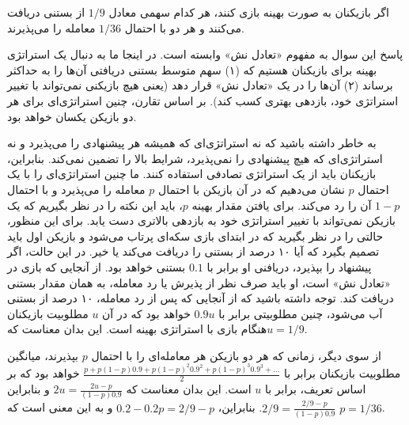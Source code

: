 \begin{solution}
اگر بازیکنان به صورت بهینه بازی کنند، هر کدام سهمی معادل $1/9$ از بستنی دریافت می‌کنند و هر دو با احتمال $1/36$ معامله را می‌پذیرند.

پاسخ این سوال به مفهوم «تعادل نش» وابسته است. در اینجا ما به دنبال یک استراتژی بهینه برای بازیکنان هستیم که (۱) سهم متوسط بستنی دریافتی آن‌ها را به حداکثر برساند (۲) آن‌ها را در یک «تعادل نش» قرار دهد (یعنی هیچ بازیکنی نمی‌تواند با تغییر استراتژی خود، بازدهی بهتری کسب کند). بر اساس تقارن، چنین استراتژی‌ای برای هر دو بازیکن یکسان خواهد بود.

به خاطر داشته باشید که نه استراتژی‌ای که همیشه هر پیشنهادی را می‌پذیرد و نه استراتژی‌ای که هیچ پیشنهادی را نمی‌پذیرد، شرایط بالا را تضمین نمی‌کند. بنابراین، بازیکنان باید از یک استراتژی تصادفی استفاده کنند. ما چنین استراتژی‌ای را با یک احتمال $p$ نشان می‌دهیم که در آن بازیکن با احتمال $p$ معامله را می‌پذیرد و با احتمال $1-p$ آن را رد می‌کند. برای یافتن مقدار بهینه $p$، باید این نکته را در نظر بگیریم که یک بازیکن نمی‌تواند با تغییر استراتژی خود به بازدهی بالاتری دست یابد. برای این منظور،  حالتی را در نظر بگیرید که در ابتدای بازی سکه‌ای پرتاب می‌شود و بازیکن اول باید تصمیم بگیرد که آیا ۱۰ درصد از بستنی را دریافت می‌کند یا خیر. در این حالت، اگر پیشنهاد را بپذیرد، دریافنی او برابر با $0.1$ بستنی خواهد بود. از آنجایی که بازی در «تعادل نش» است، او باید صرف نظر از پذیرش یا رد معامله، به همان مقدار بستنی دریافت کند. توجه داشته باشید که از آنجایی که پس از رد معامله، ۱۰ درصد از بستنی آب می‌شود، چنین مطلوبیتی برابر با $0.9 u$ خواهد بود که در آن $u$ مطلوبیت بازیکنان هنگام بازی با استراتژی بهینه است. این بدان معناست که$u=1/9‏$‎.

از سوی دیگر، زمانی که هر دو بازیکن هر معامله‌ای را با احتمال $p$ بپذیرند، میانگین مطلوبیت بازیکنان برابر با $\frac{p + p(1-p)  0.9 + p(1-p)^2 0.9^2 + p(1-p)^3 0.9^3 + \ldots}{2}$ خواهد بود که بر اساس تعریف، برابر با $u$ است. این بدان معناست که $2u = \frac{2u-p}{(1-p)0.9}$ و بنابراین $2/9 = \frac{2/9 - p}{(1-p)0.9}$. بنابراین، $0.2 - 0.2 p = 2/9 - p$ و به این معنی است که $p = 1/36$.


\end{solution}
